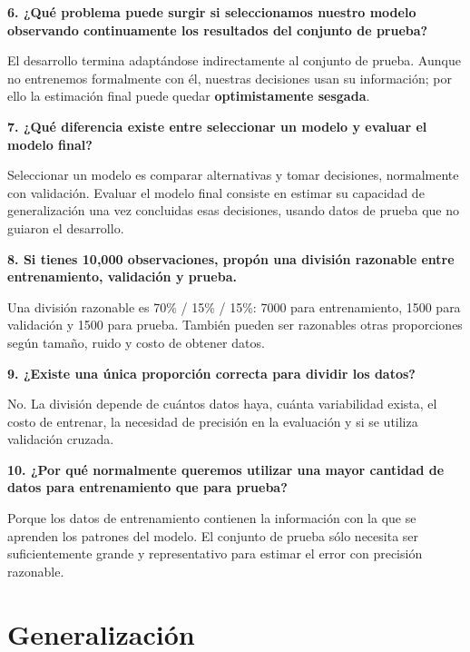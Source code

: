 \documentclass[11pt]{article}
\newcommand{\pregunta}[1]{\vspace{2mm}\textbf{#1}}
\begin{document}
\pregunta{6. ¿Qué problema puede surgir si seleccionamos nuestro modelo observando continuamente los resultados del conjunto de prueba?}
\begin{respuesta}
El desarrollo termina adaptándose indirectamente al conjunto de prueba. Aunque no entrenemos formalmente con él, nuestras decisiones usan su información; por ello la estimación final puede quedar \textbf{optimistamente sesgada}.
\end{respuesta}

\pregunta{7. ¿Qué diferencia existe entre seleccionar un modelo y evaluar el modelo final?}
\begin{respuesta}
Seleccionar un modelo es comparar alternativas y tomar decisiones, normalmente con validación. Evaluar el modelo final consiste en estimar su capacidad de generalización una vez concluidas esas decisiones, usando datos de prueba que no guiaron el desarrollo.
\end{respuesta}

\pregunta{8. Si tienes 10,000 observaciones, propón una división razonable entre entrenamiento, validación y prueba.}
\begin{respuesta}
Una división razonable es 70\% / 15\% / 15\%: 7000 para entrenamiento, 1500 para validación y 1500 para prueba. También pueden ser razonables otras proporciones según tamaño, ruido y costo de obtener datos.
\end{respuesta}

\pregunta{9. ¿Existe una única proporción correcta para dividir los datos?}
\begin{respuesta}
No. La división depende de cuántos datos haya, cuánta variabilidad exista, el costo de entrenar, la necesidad de precisión en la evaluación y si se utiliza validación cruzada.
\end{respuesta}

\pregunta{10. ¿Por qué normalmente queremos utilizar una mayor cantidad de datos para entrenamiento que para prueba?}
\begin{respuesta}
Porque los datos de entrenamiento contienen la información con la que se aprenden los patrones del modelo. El conjunto de prueba sólo necesita ser suficientemente grande y representativo para estimar el error con precisión razonable.
\end{respuesta}

\section{Generalización}
\end{document}
